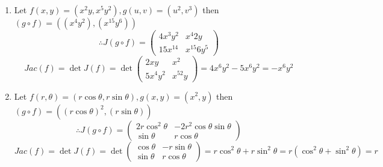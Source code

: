 \documentclass[a4paper,12pt]{article}
\begin{document}
\begin{enumerate}
	\item Let $f(x,y)=(x^2y,x^5y^2), g(u,v)=(u^2,v^3)$ then $(g\circ f) = ((x^4y^2), (x^{15}y^6))$
	\begin{equation*}
	\therefore J(g\circ f) = \begin{pmatrix}
	4x^3y^2 & x^4 2y\\
	15x^{14} & x^{15}6y^5
	\end{pmatrix}
	\end{equation*}
	\begin{equation*}
	Jac(f) = \det J(f) = \det \begin{pmatrix}
	2xy & x^2\\
	5x^4y^2 & x^52y
	\end{pmatrix} = 4x^6y^2 - 5x^6y^2 = -x^6y^2
	\end{equation*}
	
	\item Let $f(r,\theta)=(r\cos\theta,r\sin\theta), g(x,y)=(x^2,y)$ then $(g\circ f) = ((r\cos\theta)^2, (r\sin\theta))$
	\begin{equation*}
	\therefore J(g\circ f) = \begin{pmatrix}
	2r\cos^2\theta & -2r^2\cos\theta\sin\theta\\
	\sin\theta & r\cos\theta
	\end{pmatrix}
	\end{equation*}
	\begin{equation*}
	Jac(f) = \det J(f) = \det \begin{pmatrix}
	\cos\theta & -r\sin\theta\\
	\sin\theta & r\cos\theta
	\end{pmatrix} = r\cos^2\theta + r\sin^2\theta = r(\cos^2\theta + \sin^2\theta) = r
	\end{equation*}
\end{enumerate}
\end{document}
